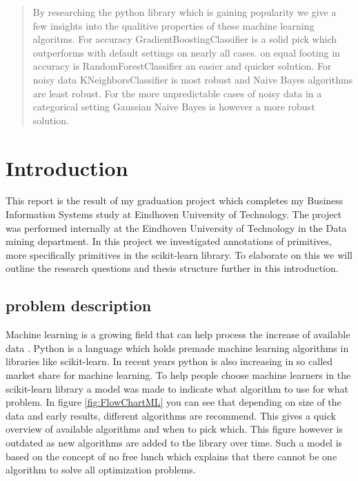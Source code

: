 \documentclass[a4paper,10pt]{article}
\begin{document}
\begin{abstract}
 By researching the python library which is gaining popularity we give a few insights into the qualitive properties of these machine learning algoritms. For accuracy GradientBoostingClassifier is a solid pick which outperforms with default settings on nearly all cases. on equal footing in accuracy is RandomForestClassifier an easier and quicker solution. For noisy data KNeighborsClassifier is most robust and Naive Bayes algorithms are least robust. For the more unpredictable cases of noisy data in a categorical setting Gaussian Naive Bayes is however a more robust solution.

\end{abstract}

\newpage
\tableofcontents
\newpage


\section{Introduction} \label{Chapter1}
This report is the result of my graduation project which completes my Business Information Systems study at Eindhoven University of Technology.
The project was performed internally at the Eindhoven University of Technology in the Data mining department.
In this project we investigated annotations of primitives, more specifically primitives in the scikit-learn library.
To elaborate on this we will outline the research questions and thesis structure further in this introduction.
 

\subsection{problem description}\label{Intr-Prob}
Machine learning is a growing field that can help process the increase of available data \cite{Big-data}\cite{ML-trends}. 
Python is a language which holds premade machine learning algorithms in libraries like scikit-learn\cite{scikit-learn}.
In recent years python is also increasing in so called market share for machine learning\cite{python-pop}.
To help people choose machine learners in the scikit-learn library a model was made to indicate what algorithm to use for what problem. In figure \ref{fig:FlowChartML} you can see that depending on size of the data and early results, different algorithms are recommend. This gives a quick overview of available algorithms and when to pick which. This figure however is outdated as new algorithms are added to the library over time. Such a model is based on the concept of no free lunch which explains that there cannot be one algorithm to solve all optimization problems\cite{No-Free-Lunch}.  
 
\end{document}
